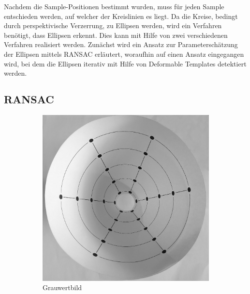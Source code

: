 Nachdem die Sample-Positionen bestimmt wurden, muss für jeden Sample entschieden werden, auf welcher der Kreislinien es liegt. Da die Kreise, bedingt durch perspektivische Verzerrung, zu Ellipsen werden, wird ein Verfahren benötigt, dass Ellipsen erkennt.
Dies kann mit Hilfe von zwei verschiedenen Verfahren realisiert werden. Zunächst wird ein Ansatz zur Parameterschätzung der Ellipsen mittels RANSAC erläutert, woraufhin auf einen Ansatz eingegangen wird, bei dem die Ellipsen iterativ mit Hilfe von Deformable Templates
detektiert werden.

\subsection{RANSAC}


\begin{figure}[!htb]
	\centering
	\begin{subfigure}{.5\textwidth}
		\centering
		\includegraphics[width=.9\textwidth]{images/grey.png}
		\caption{Grauwertbild}
		\label{fig:beforeCanny}
	\end{subfigure}%
	\begin{subfigure}{.5\textwidth}
		\centering

\end{subfigure}
\end{figure}
